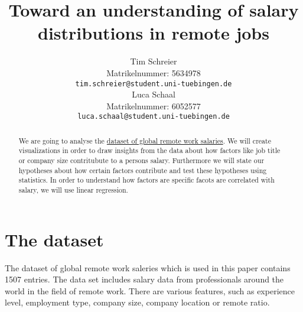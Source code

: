 \documentclass{article}
\title{Toward an understanding of salary distributions in remote jobs}
\author{%
  Tim Schreier\\
  Matrikelnummer: 5634978\\
  \texttt{tim.schreier@student.uni-tuebingen.de} \\
  \And
  Luca Schaal\\
  Matrikelnummer: 6052577\\
  \texttt{luca.schaal@student.uni-tuebingen.de} \\
}
\begin{document}
\maketitle

\begin{abstract}We are going to analyse the \href{https://salaries.freshremote.work/download/}{dataset of global remote work salaries}.
We will create visualizations in order to draw insights from the data about how factors like job title or company size contritubute to a persons salary.
Furthermore we will state our hypotheses about how certain factors contribute and test these hypotheses using statistics.
In order to understand how factors are specific facots are correlated with salary, we will use linear regression.
\end{abstract}

\section{The dataset}
The dataset of global remote work saleries which is used in this paper contains 1507 entries. The data set includes salary data from professionals around the world in the field of remote work. There are various features, such as experience level, employment type, company size, company location or remote ratio. 
\end{document}
